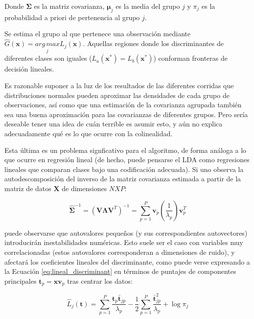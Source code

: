 \documentclass[12pt]{article}
\begin{document}
Donde $\boldsymbol{\Sigma}$ es la matriz covarianza, $\boldsymbol{\mu}_j$ es la media del grupo $j$ y $\pi_j$ es la probabilidad a priori de pertenencia al grupo $j$.  

Se estima el grupo al que pertenece una observación mediante $\hat{G}(\mathbf{x}) = \underset{j}{arg\,max} L_j (\mathbf{x})$. Aquellas regiones donde los discriminantes de diferentes clases son iguales ($L_a(\mathbf{x}^*) = L_b(\mathbf{x}^*)$) conforman fronteras de decisión lineales.

Es razonable suponer a la luz de los resultados de las diferentes corridas que distribuciones normales pueden aproximar las densidades de cada grupo de observaciones, así como que una estimación de la covarianza agrupada también sea una buena aproximación para las covarianzas de diferentes grupos. Pero sería deseable tener una idea de cuán terrible es asumir esto, y aún no explica adecuadamente qué es lo que ocurre con la colinealidad.

Esta última es un problema signficativo para el algoritmo\cite{NAES2001}, de forma análoga a lo que ocurre en regresión lineal (de hecho, puede pensarse el LDA como regresiones lineales que comparan clases bajo una codificación adecuada\cite{ESL2008}). Si uno observa la autodescomposición del inverso de la matriz covarianza estimada a partir de la matriz de datos $\mathbf{X}$ de dimensiones $NXP$:

\begin{equation} \label{eq:eigendecomposition}
\hat{\boldsymbol{\Sigma}}^{-1} = (\mathbf{V} \boldsymbol{\Lambda} \mathbf{V}^T)^{-1} = \sum_{p = 1}^{P} \mathbf{v}_p (\frac{1}{\lambda_p}) \mathbf{v}_p^T 
\end{equation}

puede observarse que autovalores pequeños (y sus correspondientes autovectores) introducirán inestabilidades numéricas. Esto suele ser el caso con variables muy correlacionadas (estos autovalores corresponderan a dimensiones de ruido), y afectará los coeficientes lineales del discriminante, como puede verse expresando a la Ecuación \ref{eq:lineal_discriminant} en términos de puntajes de componentes principales $\mathbf{t}_p = \mathbf{x} \mathbf{v}_p$ tras centrar los datos:

\begin{equation} \label{eq:score_space}
\hat{L}_j (\mathbf{t}) = \sum_{p = 1}^{P} \frac{\mathbf{t}_p \bar{\mathbf{t}}_{jp}}{\lambda_p} - \frac{1}{2}\sum_{p = 1}^{P} \frac{\bar{\mathbf{t}}_{jp}^2}{\lambda_p} + \log \pi_j
\end{equation}
\end{document}
